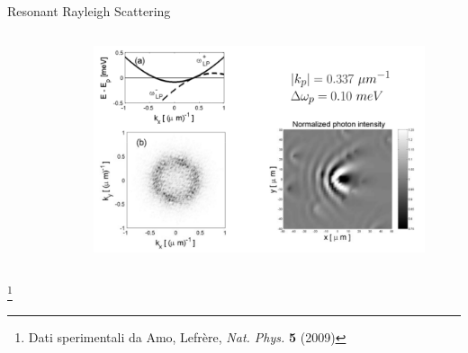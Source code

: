 \documentclass[10pt]{beamer}
\begin{document}
\begin{frame}{Resonant Rayleigh Scattering}
\begin{columns}[t]
\begin{column}{.25\textwidth}
\begin{figure}
    \end{figure}
  \end{column}
  \begin{column}{.75\textwidth}
    \begin{figure}
      \includegraphics[width=\columnwidth]{pics/scattering-RRS-teo.png}
    \end{figure}
  \end{column}
\end{columns}
\let\thefootnote\relax\footnote{\scriptsize Dati sperimentali da Amo, Lefrère, \emph{Nat. Phys.} \textbf{5} (2009) }
\end{frame}


\ifnum{}
{
 

}
\else{

}
\fi
\end{document}
